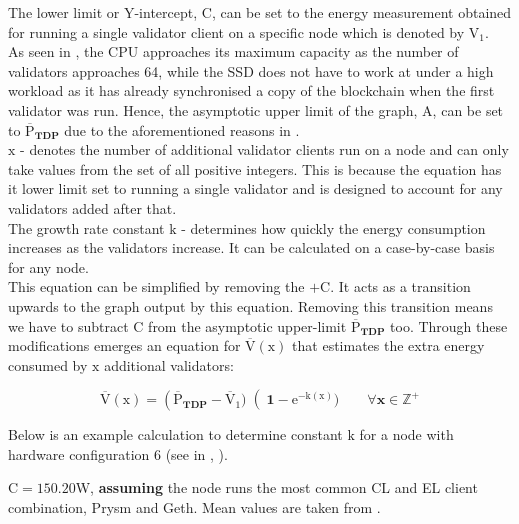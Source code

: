 The lower limit or Y-intercept, $\boldsymbol{\mathrm{C}}$, can be set to the energy measurement obtained for running a single validator client on a specific node which is denoted by $\boldsymbol{\mathrm{V_{1}}}$. \\
As seen in , the CPU approaches its maximum capacity as the number of validators approaches 64, while the SSD does not have to work at under a high workload as it has already synchronised a copy of the blockchain when the first validator was run. Hence, the asymptotic upper limit of the graph, $\boldsymbol{\mathrm{A}}$, can be set to $\boldsymbol{\mathrm{\overline{P}}_{TDP}}$ due to the aforementioned reasons in . \\
$\boldsymbol{\mathrm{x}}$ - denotes the number of additional validator clients run on a node and can only take values from the set of all positive integers. This is because the equation has it lower limit set to running a single validator and is designed to account for any validators added after that. \\
The growth rate constant $\boldsymbol{\mathrm{k}}$ - determines how quickly the energy consumption increases as the validators increase. It can be calculated on a case-by-case basis for any node. \\
This equation can be simplified by removing the $\boldsymbol{ + \mathrm{C}}$. It acts as a transition upwards to the graph output by this equation. Removing this transition means we have to subtract $\boldsymbol{ \mathrm{C}}$ from the asymptotic upper-limit $\boldsymbol{\mathrm{\overline{P}}_{TDP}}$ too. Through these modifications emerges an equation for $\boldsymbol{{\mathrm{\overline{V}(\mathrm{x})}}}$ that estimates the extra energy consumed by $\boldsymbol{\mathrm{x}}$ additional validators:

\begin{equation}
    \label{eqn:ExpDecay}
    \boldsymbol{\mathrm{\overline{V}(\mathrm{x})} = \left(\mathrm{\overline{P}}_{TDP} -\mathrm{\overline{V}_{1}} )\right(1-\mathrm{e}^{-\mathrm{k}(\mathrm{x})}) \qquad \forall x \in \mathbb{Z}^+}
\end{equation}

\label{DetermineK}
Below is an example calculation to determine constant $\boldsymbol{\mathrm{k}}$ for a node with hardware configuration 6 (see in , ). 

$\boldsymbol{\mathrm{C}} = \boldsymbol{\mathrm{150.20}} $W, \textbf{assuming} the node runs the most common CL and EL client combination, Prysm and Geth. Mean values are taken from  \cite{CryptoCarbonRatingsInstitute2022TheNetwork}.

